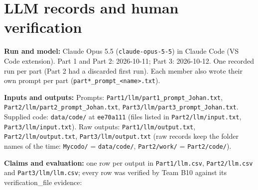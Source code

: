 \documentclass[11pt,a4paper]{article}
\newcommand{\field}[2]{\textbf{#1:} #2\par}
\begin{document}
\section{LLM records and human verification}
\field{Run and model}{Claude Opus 5.5 (\texttt{claude-opus-5-5}) in Claude Code (VS Code extension). Part 1 and Part 2: 2026-10-11; Part 3: 2026-10-12. One recorded run per part (Part 2 had a discarded first run). Each member also wrote their own prompt per part (\texttt{part*\_\allowbreak{}prompt\_\allowbreak{}\textless{}name\textgreater{}.\allowbreak{}txt}).}
\field{Inputs and outputs}{Prompts: \texttt{Part1/\allowbreak{}llm/\allowbreak{}part1\_\allowbreak{}prompt\_\allowbreak{}Johan.\allowbreak{}txt}, \texttt{Part2/\allowbreak{}llm/\allowbreak{}part2\_\allowbreak{}prompt\_\allowbreak{}Johan.\allowbreak{}txt}, \texttt{Part3/\allowbreak{}llm/\allowbreak{}part3\_\allowbreak{}prompt\_\allowbreak{}Johan.\allowbreak{}txt}. Supplied code: \texttt{data/\allowbreak{}code/\allowbreak{}} at \texttt{ee70a111} (files listed in \texttt{Part2/\allowbreak{}llm/\allowbreak{}input.\allowbreak{}txt}, \texttt{Part3/\allowbreak{}llm/\allowbreak{}input.\allowbreak{}txt}). Raw outputs: \texttt{Part1/\allowbreak{}llm/\allowbreak{}output.\allowbreak{}txt}, \texttt{Part2/\allowbreak{}llm/\allowbreak{}output.\allowbreak{}txt}, \texttt{Part3/\allowbreak{}llm/\allowbreak{}output.\allowbreak{}txt} (raw records keep the folder names of the time: \texttt{Mycodo/\allowbreak{}} = \texttt{data/\allowbreak{}code/\allowbreak{}}, \texttt{Part2/\allowbreak{}work/\allowbreak{}} = \texttt{Part2/\allowbreak{}code/\allowbreak{}}).}
\field{Claims and evaluation}{one row per output in \texttt{Part1/\allowbreak{}llm.\allowbreak{}csv}, \texttt{Part2/\allowbreak{}llm.\allowbreak{}csv} and \texttt{Part3/\allowbreak{}llm/\allowbreak{}llm.\allowbreak{}csv}; every row was verified by Team B10 against its verification\_file evidence:}
\end{document}
